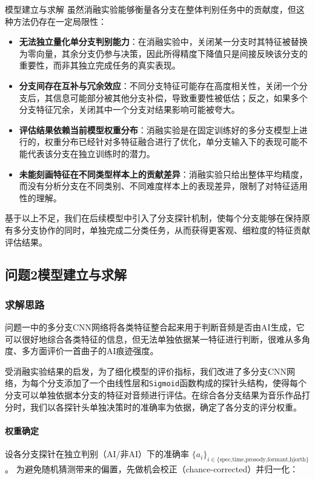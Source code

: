 \documentclass[aspectratio=169]{beamer}
\begin{document}
\begin{frame}{模型建立与求解}
虽然消融实验能够衡量各分支在整体判别任务中的贡献度，但这种方法仍存在一定局限性：  
\begin{itemize}
  \item \textbf{无法独立量化单分支判别能力}：在消融实验中，关闭某一分支时其特征被替换为零向量，其余分支仍参与决策，因此所得精度下降值只是间接反映该分支的重要性，而非其独立完成任务的真实表现。  
  \item \textbf{分支间存在互补与冗余效应}：不同分支特征可能存在高度相关性，关闭一个分支后，其信息可能部分被其他分支补偿，导致重要性被低估；反之，如果多个分支特征冗余，关闭其中一个分支对结果影响可能被夸大。  
  \item \textbf{评估结果依赖当前模型权重分布}：消融实验是在固定训练好的多分支模型上进行的，权重分布已经针对多特征融合进行了优化，单分支输入下的表现可能不能代表该分支在独立训练时的潜力。  
  \item \textbf{未能刻画特征在不同类型样本上的贡献差异}：消融实验只给出整体平均精度，而没有分析分支在不同类别、不同难度样本上的表现差异，限制了对特征适用性的理解。  
\end{itemize}
基于以上不足，我们在后续模型中引入了分支探针机制，使每个分支能够在保持原有多分支协作的同时，单独完成二分类任务，从而获得更客观、细粒度的特征贡献评估结果。


\subsection{问题2模型建立与求解}
\subsubsection{求解思路}
问题一中的多分支CNN网络将各类特征整合起来用于判断音频是否由AI生成，它可以很好地综合各类特征的信息，但无法单独依据某一特征进行判断，很难从多角度、多方面评价一首曲子的AI痕迹强度。

受消融实验结果的启发，为了细化模型的评价指标，我们改进了多分支CNN网络，为每个分支添加了一个由线性层和\texttt{Sigmoid}函数构成的探针头结构，使得每个分支可以单独依据本分支的特征对音频进行评估。在综合各分支结果为音乐作品打分时，我们以各探针头单独决策时的准确率为依据，确定了各分支的评分权重。

\paragraph{权重确定} 设各分支探针在独立判别（AI/非AI）下的准确率
$\{a_i\}_{i\in\{\text{spec,time,prosody,formant,hjorth}\}}$。
为避免随机猜测带来的偏置，先做机会校正（chance-corrected）并归一化：


\end{frame}
\end{document}
